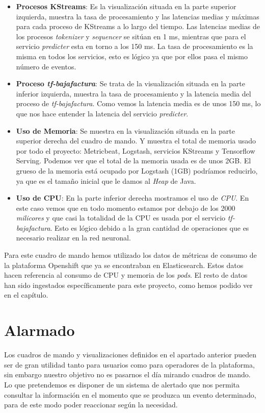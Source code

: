 \begin{itemize}
\item \textbf{Procesos KStreams}: Es la visualización situada en la parte superior izquierda, muestra la tasa de procesamiento y  las latencias medias y máximas para cada proceso de KStreams a lo largo del tiempo. Las latencias medias de los procesos \textit{tokenizer} y \textit{sequencer} se sitúan en 1 ms, mientras que para el servicio \textit{predicter} esta en torno a los 150 ms. La tasa de procesamiento es la misma en todos los servicios, esto es lógico ya que por ellos pasa el mismo número de eventos.

\item \textbf{Proceso \textit{tf-bajafactura}}: Se trata de la visualización situada en la parte inferior izquierda, muestra la tasa de procesamiento y  la latencia media del proceso de \textit{tf-bajafactura}. Como vemos la latencia media es de unos 150 ms, lo que nos hace entender la latencia del servicio \textit{predicter}.
  
\item \textbf{Uso de Memoria}: Se muestra en la visualización situada en la parte superior derecha del cuadro de mando. Y muestra el total de memoria usado por todo el proyecto: Metricbeat, Logstash, servicios KStreams y Tensorflow Serving. Podemos ver que el total de la memoria usada es de unos 2GB. El grueso de la memoria está ocupado por Logstash (1GB) podríamos reducirlo, ya que es el tamaño inicial que le damos al \textit{Heap} de Java. 


\item \textbf{Uso de CPU}: En la parte inferior derecha mostramos el uso de \textit{CPU}. En este caso vemos que en todo momento estamos por debajo de los 2000 \textit{milicores} y que casi la totalidad de la CPU es usada por el servicio \textit{tf-bajafactura}. Esto es lógico debido a la gran cantidad de operaciones que es necesario realizar en la red neuronal. 

\end{itemize}


Para este cuadro de mando hemos utilizado los datos de métricas de consumo de la plataforma Openshift que ya se encontraban en Elasticsearch. Estos datos hacen referencia al consumo de CPU y memoria de los \textit{pods}. El resto de datos han sido ingestados específicamente para este proyecto, como hemos podido ver en el capítulo. 



\section{Alarmado}
Los cuadros de mando y visualizaciones definidos en el apartado anterior pueden ser de gran utilidad tanto para usuarios como para operadores de la plataforma, sin embargo nuestro objetivo no es pasarnos el día mirando cuadros de mando. Lo que pretendemos es disponer de un sistema de alertado que nos permita consultar la información en el momento que se produzca un evento determinado, para de este modo poder reaccionar según la necesidad. 

